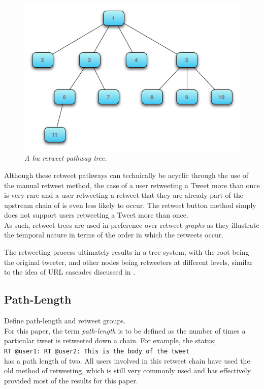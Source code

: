 \begin{figure}[h]
\centering
\includegraphics[scale=0.5]{3.Chapter1/Media/tree.png} 
\caption{\textit{A hu retweet pathway tree.}}
\label{fig:retweet_tree}
\end{figure}

Although these retweet pathways can technically be acyclic through the use of the manual retweet method, the case of a user retweeting a Tweet more than once is very rare and a user retweeting a retweet that they are already part of the upstream chain of is even less likely to occur. The retweet button method simply does not support users retweeting a Tweet more than once.\\
As such, retweet trees are used in preference over retweet \textit{graphs} as they illustrate the temporal nature in terms of the order in which the retweets occur.

The retweeting process ultimately results in a tree system, with the root being the original tweeter, and other nodes being retweeters at different levels, similar to the idea of URL cascades discussed in \cite{galuba10}.\\


\subsection{Path-Length}
Define path-length and retweet groups.\\
For this paper, the term \textit{path-length} is to be defined as the number of times a particular tweet is retweeted down a chain. For example, the status;\\ \texttt{RT @user1: RT @user2: This is the body of the tweet} \\has a path length of two. All users involved in this retweet chain have used the old method of retweeting, which is still very commonly used and has effectively provided most of the results for this paper.\\


